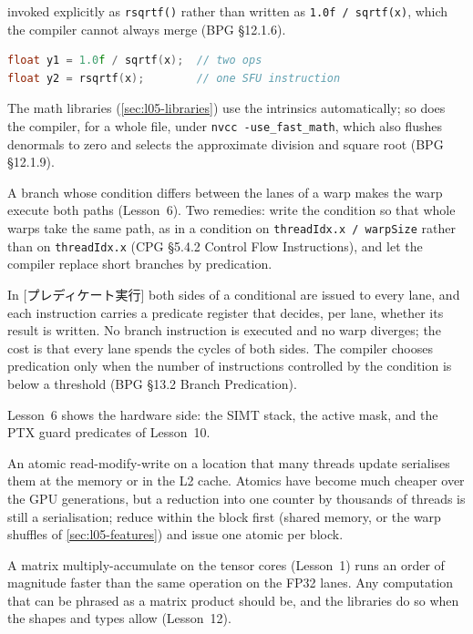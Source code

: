 \documentclass[../main.tex]{subfiles}
\begin{document}
\begin{description}
\begin{definition}
{      invoked explicitly as \texttt{rsqrtf()}} rather than written as
      \texttt{1.0f / sqrtf(x)}, which the compiler cannot always merge
      (BPG §12.1.6).
    \end{definition}
\begin{lstlisting}[language=C++, numbers=none]
float y1 = 1.0f / sqrtf(x);  // two ops
float y2 = rsqrtf(x);        // one SFU instruction
\end{lstlisting}
    The math libraries (\cref{sec:l05-libraries}) use the intrinsics
    automatically; so does the compiler, for a whole file, under
    \texttt{nvcc -use\_fast\_math}, which also flushes denormals to zero
    and selects the approximate division and square root
    (BPG §12.1.9).
  \item[Fewer branches.]  A branch whose condition differs between the
    lanes of a warp makes the warp execute both paths (Lesson~6).  Two
    remedies: write the condition so that whole warps take the same
    path, as in a condition on \texttt{threadIdx.x / warpSize} rather
    than on \texttt{threadIdx.x} (CPG §5.4.2 Control Flow Instructions),
    and let the compiler replace short branches by predication.
    \begin{definition}
      In [プレディケート実行] both sides of a
      conditional are issued to every lane, and each instruction carries
      a predicate register that decides, per lane, whether its result is
      written.  No branch instruction is executed and no warp diverges;
      the cost is that every lane spends the cycles of both sides.  The
      compiler chooses predication only when the number of instructions
      controlled by the condition is below a threshold
      (BPG §13.2 Branch Predication).
    \end{definition}
    Lesson~6 shows the hardware side: the SIMT stack, the active mask,
    and the PTX guard predicates of Lesson~10.
  \item[Avoid atomics.]  An atomic read-modify-write on a location that
    many threads update serialises them at the memory or in the L2
    cache.  Atomics have become much cheaper over the GPU generations,
    but a reduction into one counter by thousands of threads is still a
    serialisation; reduce within the block first (shared memory, or the
    warp shuffles of \cref{sec:l05-features}) and issue one atomic per
    block.
  \item[Tensor cores.]  A matrix multiply-accumulate on the tensor cores
    (Lesson~1) runs an order of magnitude faster than the same
    operation on the FP32 lanes.  Any computation that can be phrased as
    a matrix product should be, and the libraries do so when the shapes
    and types allow (Lesson~12).
\end{description}
\end{document}
